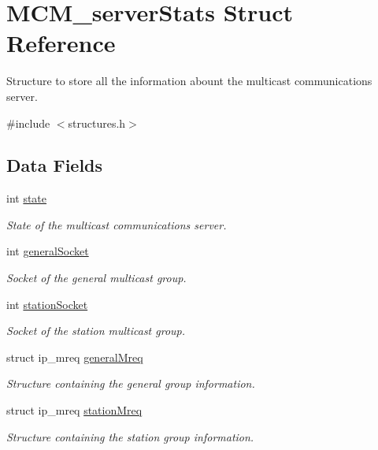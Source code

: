 \hypertarget{struct_m_c_m__server_stats}{}\section{M\+C\+M\+\_\+server\+Stats Struct Reference}
\label{struct_m_c_m__server_stats}


Structure to store all the information abount the multicast communications server.  




{\ttfamily \#include $<$structures.\+h$>$}

\subsection*{Data Fields}
\begin{DoxyCompactItemize}
\item 
int \hyperlink{struct_m_c_m__server_stats_a89f234133d3efe315836311cbf21c64b}{state}
\begin{DoxyCompactList}\small\item\em State of the multicast communications server. \end{DoxyCompactList}\item 
int \hyperlink{struct_m_c_m__server_stats_a801011852e5b93cad7c4cf405983d797}{general\+Socket}
\begin{DoxyCompactList}\small\item\em Socket of the general multicast group. \end{DoxyCompactList}\item 
int \hyperlink{struct_m_c_m__server_stats_a67066952f338a9b037e27997855a456b}{station\+Socket}
\begin{DoxyCompactList}\small\item\em Socket of the station multicast group. \end{DoxyCompactList}\item 
struct ip\+\_\+mreq \hyperlink{struct_m_c_m__server_stats_a4b8f1676ba2e5909c95e2c4eb4b0658b}{general\+Mreq}
\begin{DoxyCompactList}\small\item\em Structure containing the general group information. \end{DoxyCompactList}\item 
struct ip\+\_\+mreq \hyperlink{struct_m_c_m__server_stats_aae161e5b6e12fa4eb0e8ec3917b20966}{station\+Mreq}
\begin{DoxyCompactList}\small\item\em Structure containing the station group information. \end{DoxyCompactList}\item 

\end{DoxyCompactItemize}
